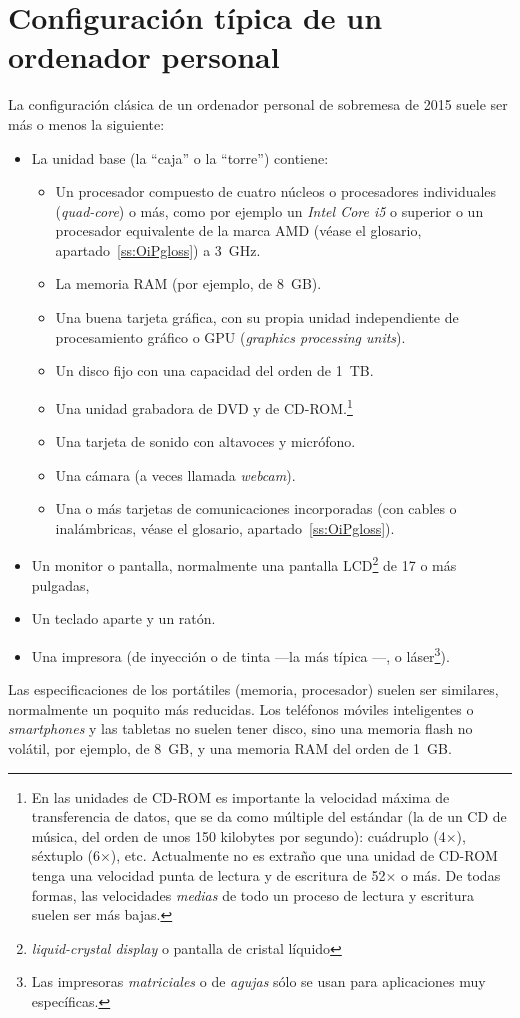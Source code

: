 \section{Configuración típica de un ordenador personal} La configuración clásica de un ordenador personal de sobremesa de 2015 suele ser más o menos la siguiente: \begin{itemize} \item La unidad base (la ``caja'' o la ``torre'') contiene: \begin{itemize} \item Un procesador compuesto de cuatro núcleos o procesadores individuales (\emph{quad-core}) o más, como por ejemplo un \emph{Intel Core i5} o superior o un procesador equivalente de la marca AMD (véase el glosario, apartado~\ref{ss:OiPgloss}) a 3~GHz. \item La memoria RAM (por ejemplo, de 8~GB). \item Una buena tarjeta gráfica, con su propia unidad independiente de procesamiento gráfico o GPU (\emph{graphics processing units}). \item Un disco fijo con una capacidad del orden de 1~TB. \item Una unidad grabadora de DVD y de CD-ROM.\footnote{En las unidades de CD-ROM es importante la velocidad máxima de transferencia de datos, que se da como múltiple del estándar (la de un CD de música, del orden de unos 150 kilobytes por segundo): cuádruplo (4$\times$), séxtuplo (6$\times$), etc. Actualmente no es extraño que una unidad de CD-ROM tenga una velocidad punta de lectura y de escritura de 52$\times$ o más. De todas formas, las velocidades \emph{medias} de todo un proceso de lectura y escritura suelen ser más bajas.} \item Una tarjeta de sonido con altavoces y micrófono. \item Una cámara (a veces llamada \emph{webcam}). \item Una o más tarjetas de comunicaciones incorporadas (con cables o inalámbricas, véase el glosario, apartado~\ref{ss:OiPgloss}). \end{itemize} \item Un monitor o pantalla, normalmente una pantalla LCD\footnote{\emph{liquid-crystal display} o pantalla de cristal líquido} de 17 o más pulgadas, \item Un teclado aparte y un ratón. \item Una impresora (de inyección o de tinta ---la más típica ---, o láser\footnote{Las impresoras \emph{matriciales} o de \emph{agujas} sólo se usan para aplicaciones muy específicas.}). \end{itemize} Las especificaciones de los portátiles (memoria, procesador) suelen ser similares, normalmente un poquito más reducidas. Los teléfonos móviles inteligentes o \emph{smartphones} y las tabletas no suelen tener disco, sino una memoria flash no volátil, por ejemplo, de 8~GB, y una memoria RAM del orden de 1~GB. 

